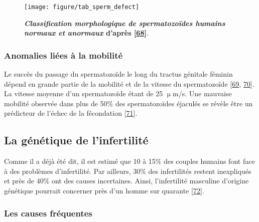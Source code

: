 \documentclass[12pt,a4paper,twoside]{ugathesis}
\theoremstyle{definition}
\theoremstyle{definition}
\theoremstyle{definition}
\theoremstyle{remark}
\begin{document}
\newpage  

\begin{figure}

{\centering \texttt{[image: figure/tab\_sperm\_defect]} 

}

\caption[Classification morphologique de spermatozoïdes humains normaux et anormaux]{\textbf{\emph{Classification morphologique de
spermatozoïdes humains normaux et anormaux} d'après
{[}\protect\hyperlink{ref-Auger2001}{68}{]}}.}\label{fig:anomaliemorphosperm}
\end{figure}





\newpage

\subsubsection{Anomalies liées à la
mobilité}\label{anomalies-liees-a-la-mobilite}

Le succès du passage du spermatozoïde le long du tractus génitale
féminin dépend en grande partie de la mobilité et de la vitesse du
spermatozoïde {[}\protect\hyperlink{ref-Lindholmer1974}{69},
\protect\hyperlink{ref-Bjorndahl2010}{70}{]}. La vitesse moyenne d'un
spermatozoïde étant de 25 \(\upmu\)m/s. Une mauvaise mobilité observée
dans plus de 50\% des spermatozoïdes éjaculés se révèle être un
prédicteur de l'échec de la fécondation
{[}\protect\hyperlink{ref-Aitken1985}{71}{]}.

\subsection{La génétique de
l'infertilité}\label{la-genetique-de-linfertilite}

Comme il a déjà été dit, il est estimé que 10 à 15\% des couples humains
font face à des problèmes d'infertilité. Par ailleurs, 30\% des
infertilités restent inexpliqués et près de 40\% ont des causes
incertaines. Ainsi, l'infertilité masculine d'origine génétique pourrait
concerner près d'un homme sur quarante
{[}\protect\hyperlink{ref-Tuttelmann2011}{72}{]}.

\subsubsection{Les causes fréquentes}\label{les-causes-frequentes}
\end{document}
